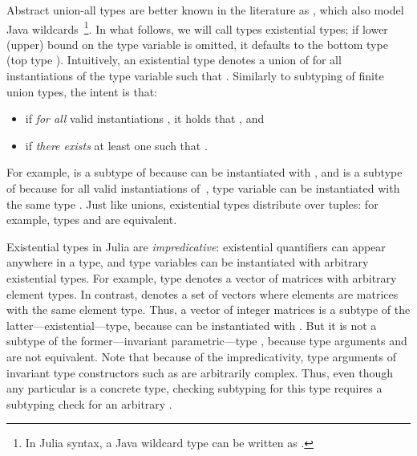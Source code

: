 Abstract union-all types  are better known
in the literature as , which also model
Java wildcards~\cite{torgersen:wildcards:2004}\footnote{In Julia syntax, 
a Java wildcard type
 can be written as .}.
In what follows, we will call types  existential types;
if lower (upper) bound on the type variable is omitted, it defaults to the
bottom type  (top type ).
Intuitively, an existential type denotes a union of  for all
instantiations of the type variable  such that .
Similarly to subtyping of finite union types, the intent is that:
\begin{itemize}
  \item {} if \emph{for all} valid instantiations
    , it holds that , and
  \item {} if \emph{there exists} at least one 
     such that .
\end{itemize}
For example,  is a subtype of  because  can be instantiated with ,
and  is a subtype of
 because for all valid instantiations  of~,
type variable  can be instantiated with the same type .
Just like unions, existential types distribute over tuples:
for example, types 
and  are equivalent.

Existential types in Julia are \emph{impredicative}:
existential quantifiers can appear anywhere in a type,
and type variables can be instantiated with arbitrary existential types.
For example, type  denotes a vector
of matrices with arbitrary element types.
In contrast,  denotes a set of vectors where
elements are matrices with the same element type.
Thus, a vector of integer matrices  is a subtype
of the latter---existential---type, because  can be instantiated with
. But it is not a subtype of the former---invariant parametric---type
, because type arguments 
and  are not equivalent.
Note that because of the impredicativity, type arguments of invariant type
constructors such as  are arbitrarily complex. Thus, even though any
particular  is a concrete type, checking subtyping for this
type requires a subtyping check for an arbitrary .

